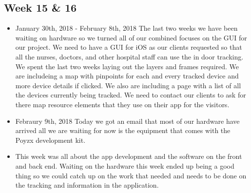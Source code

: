 \documentclass[12pt]{article}
\begin{document}
	\subsection{Week 15 \& 16}
		\begin{itemize}
			\item January 30th, 2018 - February 8th, 2018 The last two weeks we have been waiting on hardware so we turned all of our combined focuses on the GUI for our project. We need to have a GUI for iOS as our clients requested so that all the nurses, doctors, and other hospital staff can use the in door tracking. We spent the last two weeks laying out the layers and frames required. We are includeing a map with pinpoints for each and every tracked device and more device details if clicked. We also are including a page with a list of all the devices currently being tracked.  We need to contact our clients to ask for there map resource elements that they use on their app for the visitors.
			\item Febraury 9th, 2018 Today we got an email that most of our hardware have arrived all we are waiting for now is the equipment that comes with the Poyzx development kit.
			\item This week was all about the app development and the software on the front and back end. Waiting on the hardware this week ended up being a good thing so we could catch up on the work that needed and needs to be done on the tracking and information in the application.
		\end{itemize}
		
\end{document}
